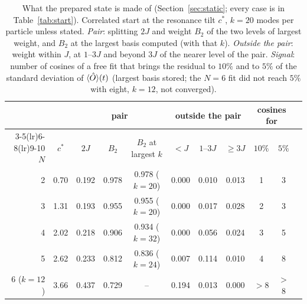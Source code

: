 \begin{table}[ht]
\centering
\footnotesize
\caption{What the prepared state is made of (Section~\ref{sec:static}; every case is in Table~\ref{tab:start}). Correlated start at the resonance tilt $c^*$, $k=20$ modes per particle unless stated. \emph{Pair}: splitting $2J$ and weight $B_2$ of the two levels of largest weight, and $B_2$ at the largest basis computed (with that $k$). \emph{Outside the pair}: weight within $J$, at $1$--$3J$ and beyond $3J$ of the nearer level of the pair. \emph{Signal}: number of cosines of a free fit that brings the residual to $10\%$ and to $5\%$ of the standard deviation of $\langle\hat O\rangle(t)$ (largest basis stored; the $N=6$ fit did not reach $5\%$ with eight, $k=12$, not converged).}
\label{tab:static}
\begin{tabular}{rcccccccccc}
\toprule
 & & \multicolumn{3}{c}{pair} & \multicolumn{3}{c}{outside the pair} & \multicolumn{2}{c}{cosines for} \\ \cmidrule(lr){3-5}\cmidrule(lr){6-8}\cmidrule(lr){9-10}
$N$ & $c^*$ & $2J$ & $B_2$ & $B_2$ at largest $k$ & $<J$ & $1$--$3J$ & $\ge3J$ & $10\%$ & $5\%$ \\
\midrule
2 & 0.70 & 0.192 & 0.978 & 0.978 ($k=20$) & 0.000 & 0.010 & 0.013 & 1 & 3 \\
3 & 1.31 & 0.193 & 0.955 & 0.955 ($k=20$) & 0.000 & 0.017 & 0.028 & 2 & 3 \\
4 & 2.02 & 0.218 & 0.906 & 0.934 ($k=32$) & 0.000 & 0.056 & 0.024 & 3 & 5 \\
5 & 2.62 & 0.233 & 0.812 & 0.836 ($k=24$) & 0.007 & 0.114 & 0.010 & 4 & 8 \\
6 ($k=12$) & 3.66 & 0.437 & 0.729 & -- & 0.194 & 0.013 & 0.000 & \ensuremath{>}8 & \ensuremath{>}8 \\
\bottomrule
\end{tabular}
\end{table}

